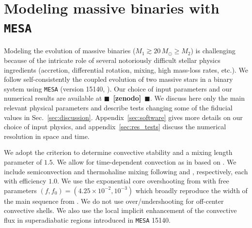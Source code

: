 \documentclass[twocolumn,twocolappendix,trackchanges]{aastex63}
\DeclareRobustCommand{\Secref}[1]{Sec.~\ref{#1}}
\newcommand{\todo}[1]{{\large $\blacksquare$~\textbf{\color{red}[#1]}}~$\blacksquare$}
\begin{document}
\section{Modeling massive binaries with \texttt{MESA}}
\label{sec:methods}

Modeling the evolution of massive binaries
($M_1\gtrsim 20\,M_\odot \geq M_2$) is challenging because of the
intricate role of several notoriously difficult stellar physics
ingredients (accretion, differential rotation, mixing, high mass-loss
rates, etc.). We follow self-consistently the coupled evolution
of two massive stars in a binary system using \texttt{MESA} (version
15140, \citealt{paxton:11, paxton:13, paxton:15, paxton:18,
  paxton:19}). Our choice of input parameters and our numerical
results are available at \todo{zenodo}. We discuss here
only the main relevant physical parameters and describe tests changing
some of the fiducial values in
\Secref{sec:discussion}. Appendix~\ref{sec:software} gives more
details on our choice of input physics, and
appendix~\ref{sec:res_tests} discuss the numerical resolution in space
and time.

We adopt the \cite{ledoux:47} criterion to determine convective
stability and a mixing length parameter of $1.5$. We allow for
time-dependent convection as in \cite{renzo:20:ppi_conv} based on
\cite{arnett:69}. We include semiconvection and thermohaline mixing
following \cite{langer:83} and \cite{kippenhahn:80}, respectively,
each with efficiency $1.0$. We use the exponential core overshooting
from \cite{herwig:00} with free parameters
$(f, f_0)=(4.25\times10^{-2}, 10^{-3})$ \citep{claret:17} which
broadly reproduce the width of the main sequence from
\cite{brott:11}. We do not use over/undershooting for off-center
convective shells. We also use the local implicit enhancement of the
convective flux in superadiabatic regions introduced
in \texttt{MESA} 15140.
\end{document}
